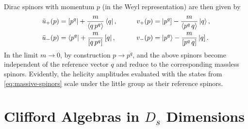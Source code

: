 Dirac spinors with momentum $p$ (in the Weyl representation) are then given by
\begin{equation} \label{eq:massive-spinors}
  \begin{aligned}
    \bar{u}_{+}(p) &= \sbra{p^q} + \frac{m}{\spaa(q,p^q)} \bra{q},  &\qquad  v_{+}(p) &= \sket{p^q} - \frac{m}{\spaa(p^q,q)} \ket{q}, \\
    \bar{u}_{-}(p) &= \bra{p^q} + \frac{m}{\spbb(q,p^q)} \sbra{q},   & v_{-}(p) &= \ket{p^q} - \frac{m}{\spbb(p^q,q)} \sket{q}.
  \end{aligned}
\end{equation}
In the limit $m\to 0$, by construction $p \to p^q$, and the above spinors become independent of the reference vector $q$ and reduce to the corresponding massless spinors.
Evidently, the helicity amplitudes evaluated with the states from \cref{eq:massive-spinors} scale under the little group as their reference spinors.



\chapter{Clifford Algebras in \texorpdfstring{$D_s$}{Ds} Dimensions}
\label{sec:clifford_algebra_ds}

